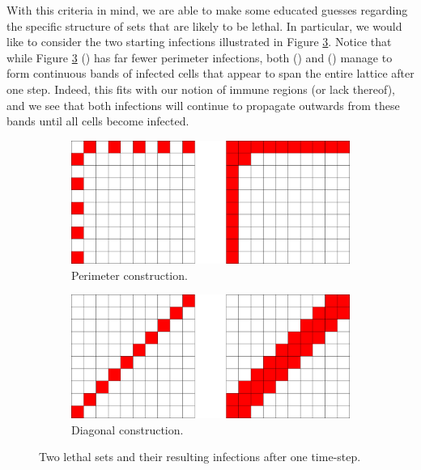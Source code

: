 With this criteria in mind, we are able to make some educated guesses regarding the specific structure of sets that are likely to be lethal. In particular, we would like to consider the two starting infections illustrated in Figure \ref{fig:two_infections}. Notice that while Figure \ref{fig:two_infections} () has far fewer perimeter infections, both () and () manage to form continuous bands of infected cells that appear to span the entire lattice after one step. Indeed, this fits with our notion of immune regions (or lack thereof), and we see that both infections will continue to propagate outwards from these bands until all cells become infected.

\begin{figure}[]
\centering
\begin{subfigure}{0.45\textwidth}
	\includegraphics[width=\textwidth]{figures/1/two_infections_a.pdf}
	\caption{Perimeter construction.}
	\label{fig:two_infections_a}
\end{subfigure} \hfill%
\begin{subfigure}{0.45\textwidth}
	\includegraphics[width=\textwidth]{figures/1/two_infections_b.pdf}
	\caption{Diagonal construction.}
	\label{fig:two_infections_b}
\end{subfigure}
\caption{Two lethal sets and their resulting infections after one time-step.}
\label{fig:two_infections}
\end{figure} 

